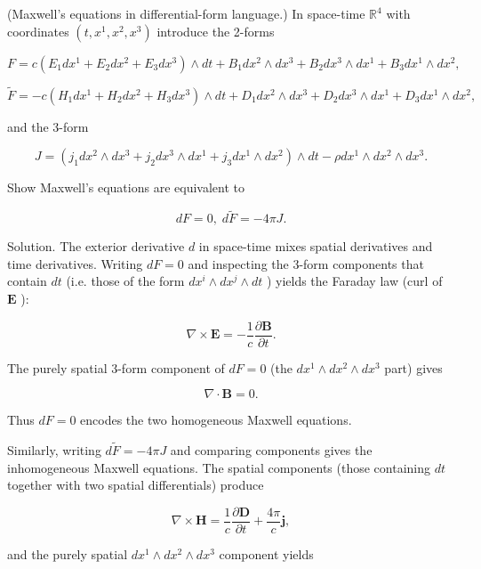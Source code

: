 \documentclass[10pt]{article}
\begin{document}
\begin{problem}[title=PROBLEM 7 (6 POINTS)]
(Maxwell’s equations in differential-form language.) In space-time \({\mathbb{R}}^{4}\) with coordinates \(\left( {t,{x}^{1},{x}^{2},{x}^{3}}\right)\) introduce the 2-forms

\[
F = c\left( {{E}_{1}d{x}^{1} + {E}_{2}d{x}^{2} + {E}_{3}d{x}^{3}}\right)  \land  {dt} + {B}_{1}d{x}^{2} \land  d{x}^{3} + {B}_{2}d{x}^{3} \land  d{x}^{1} + {B}_{3}d{x}^{1} \land  d{x}^{2},
\]

\[
\widetilde{F} =  - c\left( {{H}_{1}d{x}^{1} + {H}_{2}d{x}^{2} + {H}_{3}d{x}^{3}}\right)  \land  {dt} + {D}_{1}d{x}^{2} \land  d{x}^{3} + {D}_{2}d{x}^{3} \land  d{x}^{1} + {D}_{3}d{x}^{1} \land  d{x}^{2},
\]

and the 3-form

\[
J = \left( {{j}_{1}d{x}^{2} \land  d{x}^{3} + {j}_{2}d{x}^{3} \land  d{x}^{1} + {j}_{3}d{x}^{1} \land  d{x}^{2}}\right)  \land  {dt} - {\rho d}{x}^{1} \land  d{x}^{2} \land  d{x}^{3}.
\]

Show Maxwell's equations are equivalent to

\[
{dF} = 0,\;d\widetilde{F} =  - {4\pi J}.
\]
\end{problem}

Solution. The exterior derivative \(d\) in space-time mixes spatial derivatives and time derivatives. Writing \({dF} = 0\) and inspecting the 3-form components that contain \({dt}\) (i.e. those of the form \(d{x}^{i} \land  d{x}^{j} \land  {dt}\) ) yields the Faraday law (curl of \(\mathbf{E}\) ):

\[
\nabla  \times  \mathbf{E} =  - \frac{1}{c}\frac{\partial \mathbf{B}}{\partial t}.
\]

The purely spatial 3-form component of \({dF} = 0\) (the \(d{x}^{1} \land  d{x}^{2} \land  d{x}^{3}\) part) gives

\[
\nabla  \cdot  \mathbf{B} = 0.
\]

Thus \({dF} = 0\) encodes the two homogeneous Maxwell equations.

Similarly, writing \(d\widetilde{F} =  - {4\pi J}\) and comparing components gives the inhomogeneous Maxwell equations. The spatial components (those containing \({dt}\) together with two spatial differentials) produce

\[
\nabla  \times  \mathbf{H} = \frac{1}{c}\frac{\partial \mathbf{D}}{\partial t} + \frac{4\pi }{c}\mathbf{j},
\]

and the purely spatial \(d{x}^{1} \land  d{x}^{2} \land  d{x}^{3}\) component yields
\end{document}
